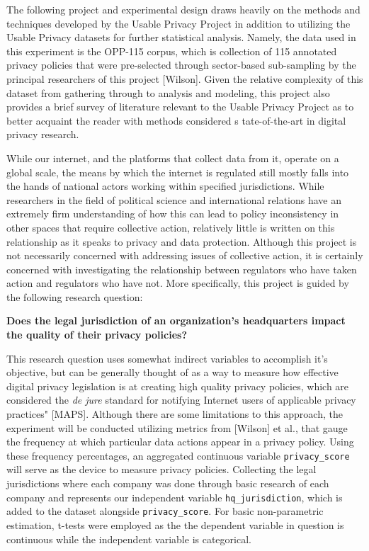 \documentclass[
]{article}
\begin{document}
The following project and experimental design draws heavily on the
methods and techniques developed by the Usable Privacy Project in
addition to utilizing the Usable Privacy datasets for further
statistical analysis. Namely, the data used in this experiment is the
OPP-115 corpus, which is collection of 115 annotated privacy policies
that were pre-selected through sector-based sub-sampling by the
principal researchers of this project {[}Wilson{]}. Given the relative
complexity of this dataset from gathering through to analysis and
modeling, this project also provides a brief survey of literature
relevant to the Usable Privacy Project as to better acquaint the reader
with methods considered s tate-of-the-art in digital privacy research.

While our internet, and the platforms that collect data from it, operate
on a global scale, the means by which the internet is regulated still
mostly falls into the hands of national actors working within specified
jurisdictions. While researchers in the field of political science and
international relations have an extremely firm understanding of how this
can lead to policy inconsistency in other spaces that require collective
action, relatively little is written on this relationship as it speaks
to privacy and data protection. Although this project is not necessarily
concerned with addressing issues of collective action, it is certainly
concerned with investigating the relationship between regulators who
have taken action and regulators who have not. More specifically, this
project is guided by the following research question:

\textbf{Does the legal jurisdiction of an organization's headquarters
impact the quality of their privacy policies?}

This research question uses somewhat indirect variables to accomplish
it's objective, but can be generally thought of as a way to measure how
effective digital privacy legislation is at creating high quality
privacy policies, which are considered the \emph{de jure} standard for
notifying Internet users of applicable privacy practices" {[}MAPS{]}.
Although there are some limitations to this approach, the experiment
will be conducted utilizing metrics from {[}Wilson{]} et al., that gauge
the frequency at which particular data actions appear in a privacy
policy. Using these frequency percentages, an aggregated continuous
variable \texttt{privacy\_score} will serve as the device to measure
privacy policies. Collecting the legal jurisdictions where each company
was done through basic research of each company and represents our
independent variable \texttt{hq\_jurisdiction}, which is added to the
dataset alongside \texttt{privacy\_score}. For basic non-parametric
estimation, t-tests were employed as the the dependent variable in
question is continuous while the independent variable is categorical.
\end{document}
